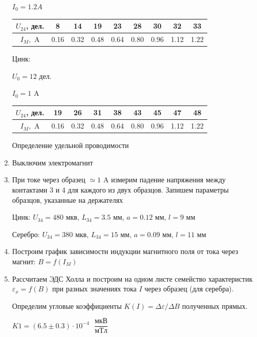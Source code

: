 \documentclass[a4paper, 12pt]{article}
\newcommand{\eps}{\varepsilon}
\begin{document}
\begin{enumerate}
        $I_0 = 1.2 A$

        \begin{tabular}{|c|c|c|c|c|c|c|c|c|} \hline
            $U_{24}$, дел. & 8 & 14 & 19 & 23 & 28 & 30 & 32 & 33 \\ \hline
            $I_M, \text{ A}$ & 0.16 & 0.32 & 0.48 & 0.64 & 0.80 & 0.96 & 1.12 & 1.22 \\ \hline
        \end{tabular}

        Цинк:

        $U_0 = 12$ дел.

        $I_0 = 1$ A

        \begin{tabular}{|c|c|c|c|c|c|c|c|c|} \hline
            $U_{24}$, дел. & 19 & 26 & 31 & 38 & 43 & 45 & 47 & 48 \\ \hline
            $I_M, \text{ A}$ & 0.16 & 0.32 & 0.48 & 0.64 & 0.80 & 0.96 & 1.12 & 1.22 \\ \hline
        \end{tabular}

        \begin{center}
            Определение удельной проводимости
        \end{center}

        \item Выключим электромагнит
        
        \item При токе через образец $\simeq 1$ A измерим падение напряжения между контактами 3 и 4 для каждого из двух образцов. Запишем параметры образцов, указанные на держателях
        
        Цинк: $U_{34} = 480$ мкв, $L_{34} = 3.5$ мм, $a = 0.12$ мм, $l = 9$ мм

        Серебро: $U_{34} = 380$ мкв, $L_{34} = 15$ мм, $a = 0.09$ мм, $l = 11$ мм

        \item Построим график зависимости индукции магнитного поля от тока через магнит: $B = f(I_M)$
        
        \item Рассчитаем ЭДС Холла и построим на одном листе семейство характеристик $\eps_x = f(B)$ при разных значениях тока $I$ через образец (для серебра).
    
        Определим угловые коэффициенты $K(I) = \Delta \eps / \Delta B$ полученных прямых.
        
        $K1 = (6.5 \pm 0.3) \cdot 10^{-4} \text{ } \dfrac{мкВ}{мТл}$


\end{enumerate}
\end{document}
